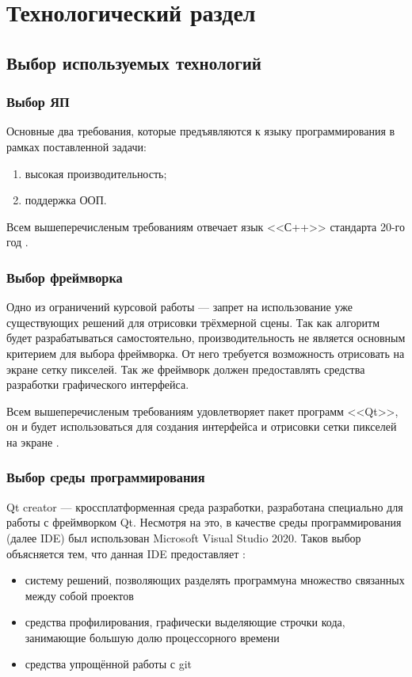 \section{Технологический раздел}
\subsection{Выбор используемых технологий}
\subsubsection{Выбор ЯП}
Основные два требования, которые предъявляются к языку программирования в рамках поставленной задачи:
\begin{enumerate}
	\item высокая производительность;
	\item поддержка ООП.
\end{enumerate}

Всем вышеперечисленым требованиям отвечает язык <<С++>> стандарта 20-го год \cite{bib:cpp_oop}.

\subsubsection{Выбор фреймворка}
Одно из ограничений курсовой работы --- запрет на использование уже существующих решений для отрисовки трёхмерной сцены. Так как алгоритм будет разрабатываться самостоятельно, производительность не является основным критерием для выбора фреймворка. От него требуется возможность отрисовать на экране сетку пикселей. Так же фреймворк должен предоставлять средства разработки графического интерфейса.

Всем вышеперечисленым требованиям удовлетворяет пакет программ <<Qt>>, он и будет использоваться для создания интерфейса и отрисовки сетки пикселей на экране \cite{bib:qt_framework}.

\subsubsection{Выбор среды программирования}
Qt creator --- кроссплатформенная среда разработки, разработана специально для работы с фреймворком Qt. Несмотря на это, в качестве среды программирования (далее IDE) был использован Microsoft Visual Studio 2020. Таков выбор объясняется тем, что данная IDE предоставляет \cite{bib:visual_studio}:

\begin{itemize}
	\item систему решений, позволяющих разделять программуна множество связанных между собой проектов
	\item средства профилирования, графически выделяющие строчки кода, занимающие большую долю процессорного времени
	\item средства упрощённой работы с git
\end{itemize}

